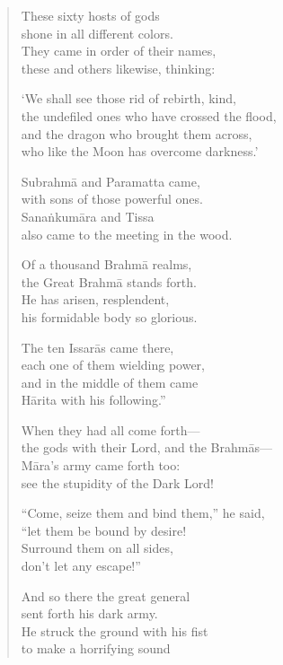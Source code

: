 \documentclass[12pt,openany]{book}%
\begin{document}
\begin{verse}
These sixty hosts of gods \\
shone in all different colors. \\
They came in order of their names, \\
these and others likewise, thinking: 

‘We shall see those rid of rebirth, kind, \\
the undefiled ones who have crossed the flood, \\
and the dragon who brought them across, \\
who like the Moon has overcome darkness.’ 

\textsanskrit{Subrahmā} and Paramatta came, \\
with sons of those powerful ones. \\
\textsanskrit{Sanaṅkumāra} and Tissa \\
also came to the meeting in the wood. 

Of a thousand \textsanskrit{Brahmā} realms, \\
the Great \textsanskrit{Brahmā} stands forth. \\
He has arisen, resplendent, \\
his formidable body so glorious. 

The ten \textsanskrit{Issarās} came there, \\
each one of them wielding power, \\
and in the middle of them came \\
\textsanskrit{Hārita} with his following.” 

When they had all come forth—\\
the gods with their Lord, and the \textsanskrit{Brahmās}—\\
\textsanskrit{Māra}’s army came forth too: \\
see the stupidity of the Dark Lord! 

“Come, seize them and bind them,” he said, \\
“let them be bound by desire! \\
Surround them on all sides, \\
don’t let any escape!” 

And so there the great general \\
sent forth his dark army. \\
He struck the ground with his fist \\
to make a horrifying sound 


\end{verse}
\end{document}

